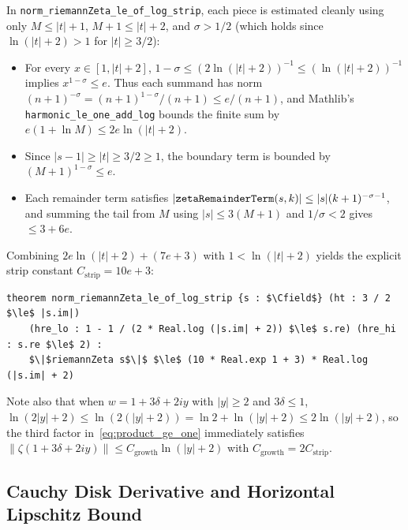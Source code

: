 \documentclass[11pt,a4paper]{article}
\theoremstyle{definition}
\newcommand{\Cfield}{\mathbb{C}}
\begin{document}
In \texttt{norm\_riemannZeta\_le\_of\_log\_strip}, each piece is estimated cleanly using only $M \le |t|+1$, $M+1 \le |t|+2$, and $\sigma > 1/2$ (which holds since $\ln(|t|+2) > 1$ for $|t| \ge 3/2$):
\begin{itemize}[noitemsep]
\item For every $x \in [1, |t|+2]$, $1 - \sigma \le (2\ln(|t|+2))^{-1} \le (\ln(|t|+2))^{-1}$ implies $x^{1-\sigma} \le e$. Thus each summand has norm $(n+1)^{-\sigma} = (n+1)^{1-\sigma}/(n+1) \le e/(n+1)$, and Mathlib's \texttt{harmonic\_le\_one\_add\_log} bounds the finite sum by $e(1 + \ln M) \le 2e\ln(|t|+2)$.
\item Since $|s-1| \ge |t| \ge 3/2 \ge 1$, the boundary term is bounded by $(M+1)^{1-\sigma} \le e$.
\item Each remainder term satisfies $|\text{\texttt{zetaRemainderTerm}}(s, k)| \le |s|(k+1)^{-\sigma-1}$, and summing the tail from $M$ using $|s| \le 3(M+1)$ and $1/\sigma < 2$ gives $\le 3 + 6e$.
\end{itemize}
Combining $2e\ln(|t|+2) + (7e+3)$ with $1 < \ln(|t|+2)$ yields the explicit strip constant $C_{\text{strip}} = 10e + 3$:
\begin{lstlisting}
theorem norm_riemannZeta_le_of_log_strip {s : $\Cfield$} (ht : 3 / 2 $\le$ |s.im|)
    (hre_lo : 1 - 1 / (2 * Real.log (|s.im| + 2)) $\le$ s.re) (hre_hi : s.re $\le$ 2) :
    $\|$riemannZeta s$\|$ $\le$ (10 * Real.exp 1 + 3) * Real.log (|s.im| + 2)
\end{lstlisting}
Note also that when $w = 1 + 3\delta + 2iy$ with $|y| \ge 2$ and $3\delta \le 1$, $\ln(2|y|+2) \le \ln(2(|y|+2)) = \ln 2 + \ln(|y|+2) \le 2\ln(|y|+2)$, so the third factor in~\eqref{eq:product_ge_one} immediately satisfies $\|\zeta(1+3\delta+2iy)\| \le C_{\text{growth}} \ln(|y|+2)$ with $C_{\text{growth}} = 2 C_{\text{strip}}$.

\subsection{Cauchy Disk Derivative and Horizontal Lipschitz Bound}
\end{document}
